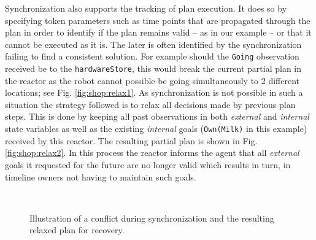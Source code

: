 
Synchronization also supports the tracking of plan execution. It does
so by specifying token parameters such as time points that are
propagated through the plan in order to identify if the plan remains
valid -- as in our example -- or that it cannot be executed as it
is. The later is often identified by the synchronization failing to
find a consistent solution. For example should the \texttt{Going}
observation received be to the \texttt{hardwareStore}, this would
break the current partial plan in the reactor as the robot cannot
possible be going simultaneously to $2$ different locations; see
Fig. \ref{fig:shop:relax1}. As synchronization is not possible in such
a situation the strategy followed is to relax all decisions made by
previous plan steps. This is done by keeping all past observations in
both {\em external} and {\em internal} state variables as well as the
existing {\em internal} goals (\texttt{Own(Milk)} in this example)
received by this reactor. The resulting partial plan is shown in
Fig. \ref{fig:shop:relax2}. In this process the reactor informs the
agent that all {\em external} goals it requested for the future are no
longer valid which results in turn, in timeline owners not having to
maintain such goals.

\begin{figure}[!htbp]
  \centering
  \\
  \caption{\small Illustration of a conflict during synchronization
    and the resulting relaxed plan for recovery.}
\end{figure}

